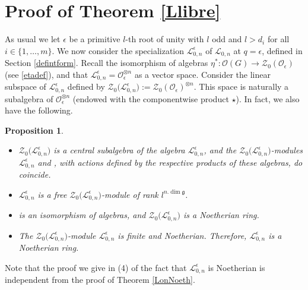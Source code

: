 \documentclass[pdftex]{sigma}
\numberwithin{equation}{section}
\newtheorem{prop}[teo]{Proposition}
\theoremstyle{definition}
\newcommand{\e}{\epsilon}
\newcommand{\Ll}{{\mathcal L}}
\newcommand{\Oo}{{\mathcal O}}
\newcommand{\ra}{\rightarrow}
\begin{document}
\section[Proof of Theorem 1.2]{Proof of Theorem \ref{Llibre}}\label{ORDER} As usual we let $\e$ be a primitive $l$-th root of unity with $l$ odd and $l>d_i$ for all $i\in \{1,\dots,m\}$. We now consider the specialization $\Ll_{0,n}^\e$ of $\Ll_{0,n}$ at $q=\e$, defined in Section \ref{defintform}. Recall the isomorphism of algebras $\eta^*\colon \Oo(G)\ra \mathcal{Z}_0(\Oo_\e)$ (see \eqref{etadef}), and that $\Ll_{0,n}^\e = \Oo_\e^{\otimes n}$ as a vector space. Consider the linear subspace of $\Ll_{0,n}^\e$ defined by $\mathcal{Z}_0\bigl(\Ll_{0,n}^\e\bigr) := \mathcal{Z}_0(\Oo_\e)^{\otimes n}$.
This space is naturally a subalgebra of $\Oo_\e^{\otimes n}$ (endowed with the componentwise product $\star$). In fact, we also have the following.

\begin{prop} \label{Z0L0n} \quad
\begin{itemize}\itemsep=0pt
\item[$(1)$] $\mathcal{Z}_0\bigl(\Ll_{0,n}^\e\bigr)$ is a central subalgebra of the algebra $\Ll_{0,n}^\e$, and the $\mathcal{Z}_0\bigl(\Ll_{0,n}^\e\bigr)$-modules $\Ll_{0,n}^\e$ and \smash{$\Oo_\e^{\otimes n}$}, with actions defined by the respective products of these algebras, do coincide.
\item[$(2)$] $\Ll_{0,n}^\e$ is a free $\mathcal{Z}_0\bigl(\Ll_{0,n}^\e\bigr)$-module of rank $l^{n.\dim \mathfrak{g}}$.
\item[$(3)$] \smash{$\big(\eta^*{}^{-1}\big)^{\otimes n}\colon \mathcal{Z}_0\bigl(\Ll_{0,n}^\e\bigr)\ra\Oo(G)^{\otimes n}$} is an isomorphism of algebras, and $\mathcal{Z}_0\bigl(\Ll_{0,n}^\e\bigr)$ is a Noetherian ring.
\item[$(4)$] The $\mathcal{Z}_0\bigl(\Ll_{0,n}^\e\bigr)$-module $\Ll_{0,n}^\e$ is finite and Noetherian. Therefore, $\Ll_{0,n}^\e$ is a Noetherian ring.
\end{itemize}
\end{prop}
Note that the proof we give in (4) of the fact that $\Ll_{0,n}^\e$ is Noetherian is independent from the proof of Theorem \ref{LonNoeth}.
\end{document}
